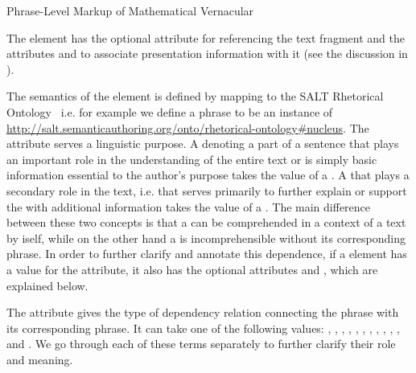 \begin{module}[id=mtext]
\begin{omgroup}[id=mtext,short=Mathematical Text]
\begin{omgroup}[id=phrases]{Phrase-Level Markup of Mathematical Vernacular}
\begin{definition}[id=span.def]
  The {} element has the optional attribute
  {} for referencing the text fragment and the {\css}
  attributes {} and {}
  to associate presentation information with it (see the discussion in
  {}).
\end{definition}

The semantics of the {} element is defined by mapping to the SALT
Rhetorical Ontology~\cite{Groza:SALT07} i.e. for example we define a
{} phrase to be an instance of
\url{http://salt.semanticauthoring.org/onto/rhetorical-ontology#nucleus}.  The
{} attribute serves a linguistic purpose. A
{} denoting a part of a sentence that plays an important role in
the understanding of the entire text or is simply basic information essential to the
author's purpose takes the value of a {}. A
{} that plays a secondary role in the text, i.e. that serves
primarily to further explain or support the {} with
additional information takes the value of a
{}. The main difference between these two concepts
is that a {} can be comprehended in a context of a
text by iself, while on the other hand a {} is
incomprehensible without its corresponding {}
phrase. In order to further clarify and annotate this dependence, if a
{} element has a value {}
for the {} attribute, it also has the optional attributes
{} and {}, which are
explained below.

  The {} attribute gives the type of dependency relation 
  connecting the {} phrase with its corresponding 
  {} phrase. It can take one of the following values: 
  {}, {}, 
  {}, {}, 
  {}, {}, 
  {}, {}, 
  {}, {}, 
  {}, {} and 
  {}. We go through each of these terms 
  separately to further clarify their role and meaning.


\end{omgroup}
\end{omgroup}
\end{module}
